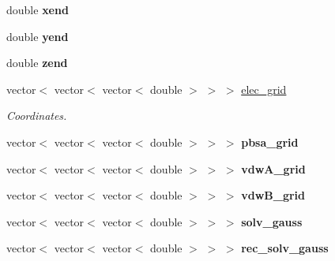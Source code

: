 \begin{DoxyCompactItemize}
\item 
\hypertarget{classGrid_a113d3513607b5ea64d9a2ee0ccec82a8}{
double {\bfseries xend}}
\label{classGrid_a113d3513607b5ea64d9a2ee0ccec82a8}

\item 
\hypertarget{classGrid_ae3e37ed0611da80cb6b41d739a407f18}{
double {\bfseries yend}}
\label{classGrid_ae3e37ed0611da80cb6b41d739a407f18}

\item 
\hypertarget{classGrid_ae0a3054ab6791eb793bee4d708113690}{
double {\bfseries zend}}
\label{classGrid_ae0a3054ab6791eb793bee4d708113690}

\item 
\hypertarget{classGrid_a5efc94c40bc9e5365a0985092ee93cc4}{
vector$<$ vector$<$ vector$<$ double $>$ $>$ $>$ \hyperlink{classGrid_a5efc94c40bc9e5365a0985092ee93cc4}{elec\_\-grid}}
\label{classGrid_a5efc94c40bc9e5365a0985092ee93cc4}

\begin{DoxyCompactList}\small\item\em Coordinates. \item\end{DoxyCompactList}\item 
\hypertarget{classGrid_aae97dd8f7b57c48af8bbdefca7f0380f}{
vector$<$ vector$<$ vector$<$ double $>$ $>$ $>$ {\bfseries pbsa\_\-grid}}
\label{classGrid_aae97dd8f7b57c48af8bbdefca7f0380f}

\item 
\hypertarget{classGrid_a6a9ff1dc6404f6f9da2537f87aaa5abd}{
vector$<$ vector$<$ vector$<$ double $>$ $>$ $>$ {\bfseries vdwA\_\-grid}}
\label{classGrid_a6a9ff1dc6404f6f9da2537f87aaa5abd}

\item 
\hypertarget{classGrid_ae0aea9da56a93ac47532356f99cae203}{
vector$<$ vector$<$ vector$<$ double $>$ $>$ $>$ {\bfseries vdwB\_\-grid}}
\label{classGrid_ae0aea9da56a93ac47532356f99cae203}

\item 
\hypertarget{classGrid_a11037d12b7e7e0fb478112ed9647e21f}{
vector$<$ vector$<$ vector$<$ double $>$ $>$ $>$ {\bfseries solv\_\-gauss}}
\label{classGrid_a11037d12b7e7e0fb478112ed9647e21f}

\item 
\hypertarget{classGrid_a6752c6502c88858cd766ff5552c6a915}{
vector$<$ vector$<$ vector$<$ double $>$ $>$ $>$ {\bfseries rec\_\-solv\_\-gauss}}
\label{classGrid_a6752c6502c88858cd766ff5552c6a915}


\end{DoxyCompactItemize}
